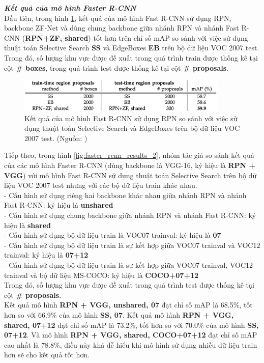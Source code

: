 {    \noindent
    \textbf{\textit{Kết quả của mô hình Faster R-CNN}} \\
    Đầu tiên, trong hình \ref{fig:faster_rcnn_results_1}, kết quả của mô hình Fast R-CNN sử dụng RPN, backbone ZF-Net và dùng chung backbone giữa nhánh RPN và nhánh Fast R-CNN (\textbf{RPN+ZF, shared}) tốt hơn trên chỉ số mAP so sánh với việc sử dụng thuật toán Selective Search \textbf{SS} và EdgeBoxes \textbf{EB} trên bộ dữ liệu VOC 2007 test. Trong đó, số lượng khu vực được đề xuất trong quá trình train được thống kê tại cột \textbf{\# boxes}, trong quá trình test được thống kê tại cột \textbf{\# proposals}.

    \begin{figure}[H]
        \centering
        \includegraphics[width=10cm] {images/faster_rcnn_results_1}
        \caption{Kết quả của mô hình Fast R-CNN sử dụng RPN so sánh với việc sử dụng thuật toán Selective Search và EdgeBoxes trên bộ dữ liệu VOC 2007 test. (Nguồn: \cite{ren2015faster})}
        \label{fig:faster_rcnn_results_1}
    \end{figure}

    \noindent
    Tiếp theo, trong hình \ref{fig:faster_rcnn_results_2}, nhóm tác giả so sánh kết quả của các mô hình Faster R-CNN (dùng backbone là VGG-16, ký hiệu là \textbf{RPN + VGG}) với mô hình Fast R-CNN sử dụng thuật toán Selective Search trên bộ dữ liệu VOC 2007 test nhưng với các bộ dữ liệu train khác nhau. \\
    - Cấu hình sử dụng riêng hai backbone khác nhau giữa nhánh RPN và nhánh Fast R-CNN: ký hiệu là \textbf{unshared} \\
    - Cấu hình sử dụng chung backbone giữa nhánh RPN và nhánh Fast R-CNN: ký hiệu là \textbf{shared} \\
    - Cấu hình sử dụng bộ dữ liệu train là VOC07 trainval: ký hiệu là \textbf{07} \\
    - Cấu hình sử dụng bộ dữ liệu train là sự kết hợp giữa VOC07 trainval và VOC12 trainval: ký hiệu là \textbf{07+12} \\
    - Cấu hình sử dụng bộ dữ liệu train là sự kết hợp giữa VOC07 trainval, VOC12 trainval và bộ dữ liệu MS-COCO: ký hiệu là \textbf{COCO+07+12} \\
    Trong đó, số lượng khu vực được đề xuất trong quá trình test được thống kê tại cột \textbf{\# proposals}. \\
    Kết quả mô hình \textbf{RPN + VGG, unshared, 07} đạt chỉ số mAP là 68.5\%, tốt hơn so với 66.9\% của mô hình \textbf{SS, 07}.
    Kết quả mô hình \textbf{RPN + VGG, shared, 07+12} đạt chỉ số mAP là 73.2\%, tốt hơn so với 70.0\% của mô hình \textbf{SS, 07+12}.
    Và mô hình \textbf{RPN + VGG, shared, COCO+07+12} đạt chỉ số mAP cao nhất là 78.8\%, điều này khá dễ hiểu khi mô hình sử dụng nhiều dữ liệu train hơn sẽ cho kết quả tốt hơn.

}
